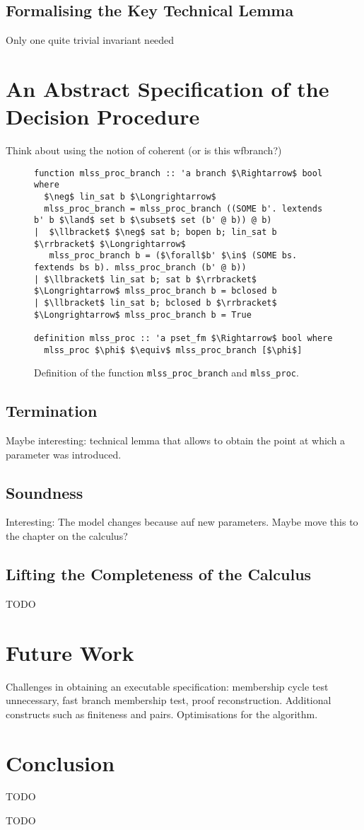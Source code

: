 \documentclass[sigplan,10pt,anonymous,review]{acmart}
\begin{document}
\subsection{Formalising the Key Technical Lemma}
Only one quite trivial invariant needed 

\section{An Abstract Specification of the Decision Procedure}
Think about using the notion of coherent (or is this wfbranch?)
\begin{figure*}
  \centering
\begin{lstlisting}
function mlss_proc_branch :: 'a branch $\Rightarrow$ bool where
  $\neg$ lin_sat b $\Longrightarrow$
  mlss_proc_branch = mlss_proc_branch ((SOME b'. lextends b' b $\land$ set b $\subset$ set (b' @ b)) @ b)
|  $\llbracket$ $\neg$ sat b; bopen b; lin_sat b $\rrbracket$ $\Longrightarrow$
   mlss_proc_branch b = ($\forall$b' $\in$ (SOME bs. fextends bs b). mlss_proc_branch (b' @ b))
| $\llbracket$ lin_sat b; sat b $\rrbracket$ $\Longrightarrow$ mlss_proc_branch b = bclosed b
| $\llbracket$ lin_sat b; bclosed b $\rrbracket$ $\Longrightarrow$ mlss_proc_branch b = True

definition mlss_proc :: 'a pset_fm $\Rightarrow$ bool where
  mlss_proc $\phi$ $\equiv$ mlss_proc_branch [$\phi$]
\end{lstlisting}
\caption{Definition of the function \lstinline|mlss_proc_branch| and \lstinline|mlss_proc|.}
\end{figure*}

\subsection{Termination}
Maybe interesting: technical lemma that allows to obtain the point at which a parameter was introduced.
\subsection{Soundness}
Interesting: The model changes because auf new parameters.
Maybe move this to the chapter on the calculus?
\subsection{Lifting the Completeness of the Calculus}
TODO

\section{Future Work}
Challenges in obtaining an executable specification: membership cycle test unnecessary, fast branch membership test, proof reconstruction.
Additional constructs such as finiteness and pairs.
Optimisations for the algorithm.

\section{Conclusion}
TODO

\begin{acks}
  TODO
\end{acks}



\end{document}
